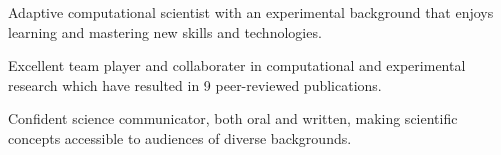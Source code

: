 

\begin{cventries}
\vspace{-4.0mm}

  \cventry
    {} %
    {} %
    {} %
    {} %
    {
      \begin{cvitems} %
        \item {Adaptive computational scientist with an experimental background that enjoys learning and mastering new skills and technologies.}
        \vspace{1.0mm}
        \item {Excellent team player and collaborater in computational and experimental research which have resulted in 9 peer-reviewed publications.}
        \vspace{1.0mm}
        \item {Confident science communicator, both oral and written, making scientific concepts accessible to audiences of diverse backgrounds.}
      \end{cvitems}
    }
\vspace{-4.0mm}
\end{cventries}
